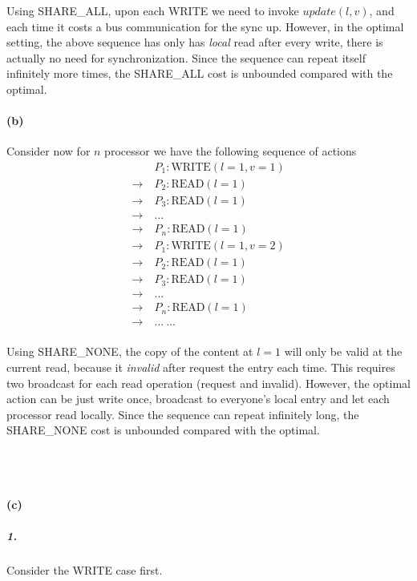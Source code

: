 \documentclass[12pt]{article}
\begin{document}
Using SHARE\_ALL, upon each WRITE we need to invoke $update(l, v)$, and each time it costs a bus communication for the sync up. However, in the optimal setting, the above sequence has only has \emph{local} read after every write, there is actually no need for synchronization. Since the sequence can repeat itself infinitely more times, the SHARE\_ALL cost is unbounded compared with the optimal. 

\paragraph{(b)} Consider now for $n$ processor we have the following sequence of actions 
\begin{align*}
&P_1: \text{WRITE}(l=1, v=1)\\
\to\: &P_2: \text{READ}(l=1) \\
\to\: &P_3: \text{READ}(l=1) \\
\to\: & \dots \\
\to\: &P_n: \text{READ}(l=1) \\
\to \: &P_1: \text{WRITE}(l=1, v=2)\\
\to\: &P_2: \text{READ}(l=1) \\
\to\: &P_3: \text{READ}(l=1) \\
\to\: & \dots \\
\to\: &P_n: \text{READ}(l=1) \\
\to\: & \dots \: \dots\\
\end{align*}

Using SHARE\_NONE, the copy of the content at $l=1$ will only be valid at the current read, because it \emph{invalid} after request the entry each time. This requires two broadcast for each read operation (request and invalid). However, the optimal action can be just write once, broadcast to everyone's local entry and let each processor read locally. Since the sequence can repeat infinitely long, the SHARE\_NONE cost is unbounded compared with the optimal.

~\\
~\\

\paragraph{(c)} \subparagraph{1. }Consider the WRITE case first. 
\end{document}
